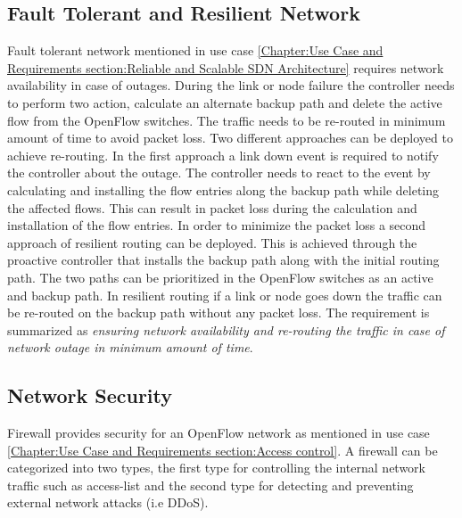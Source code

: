 \subsection{Fault Tolerant and Resilient Network}
\label{Chapter: Use cases and Requirements:Section: Fault Tolerance and Resilient Routing}
Fault tolerant network mentioned in use case \ref{Chapter:Use Case and Requirements section:Reliable and Scalable SDN Architecture} requires network availability in case of outages. During the link or node failure the controller needs to perform two action, calculate an alternate backup path and delete the active flow from the OpenFlow switches. The traffic needs to be re-routed in minimum amount of time to avoid packet loss. Two different approaches can be deployed to achieve re-routing. In the first approach a link down event is required to notify the controller about the outage. The controller needs to react to the event by calculating and installing the flow entries along the backup path while deleting the affected flows. This can result in packet loss during the calculation and installation of the flow entries. In order to minimize the packet loss a second approach of resilient routing can be deployed. This is achieved through the proactive controller that installs the backup path along with the initial routing path. The two paths can be prioritized in the OpenFlow switches as an active and backup path. In resilient routing if a link or node goes down the traffic can be re-routed on the backup path without any packet loss. The requirement is summarized as \textit{ensuring network availability and re-routing the traffic in case of network outage in minimum amount of time}.


\subsection{Network Security}
\label{Chapter: Use cases and Requirements:Section: Firewall}

Firewall provides security for an OpenFlow network as mentioned in use case \ref{Chapter:Use Case and Requirements section:Access control}. A firewall can be categorized into two types, the first type for controlling the internal network traffic such as access-list and the second type for detecting and preventing external network attacks (i.e DDoS).

